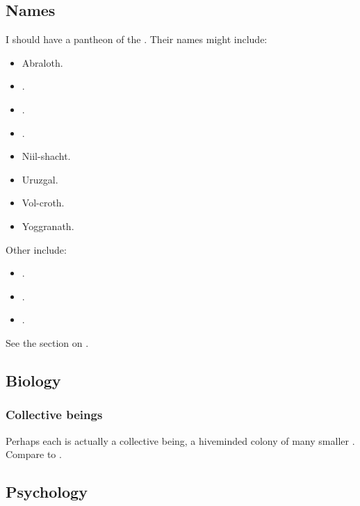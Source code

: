 \subsection{Names}
I should have a pantheon of the . Their names might include: 

\begin{itemize}
  \item Abraloth. 
  \item {}. 
  \item {}. 
  \item {}. 
  \item Niil-shacht.
  \item Uruzgal. 
  \item Vol-croth. 
  \item Yoggranath. 
\end{itemize}

Other \xss{} include:

\begin{itemize}
  \item {}. 
  \item {}.
  \item {}. 
\end{itemize}

See the section on . 










\subsection{Biology}
\subsubsection{Collective beings}
Perhaps each \xs{} is actually a collective being, a hiveminded colony of many smaller \daemons. 
Compare to . 









\subsection{Psychology}





